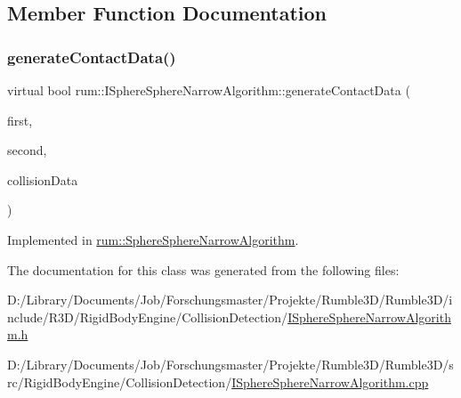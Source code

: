 \subsection{Member Function Documentation}
\mbox{\label{classrum_1_1_i_sphere_sphere_narrow_algorithm_a254273c64cab0473820639283f1e5e6f}} 
\subsubsection{\texorpdfstring{generate\+Contact\+Data()}{generateContactData()}}
{\footnotesize\ttfamily virtual bool rum\+::\+I\+Sphere\+Sphere\+Narrow\+Algorithm\+::generate\+Contact\+Data (\begin{DoxyParamCaption}\item[{\mbox{\hyperlink{classrum_1_1_collision_sphere}{Collision\+Sphere}} $\ast$}]{first,  }\item[{\mbox{\hyperlink{classrum_1_1_collision_sphere}{Collision\+Sphere}} $\ast$}]{second,  }\item[{\mbox{\hyperlink{classrum_1_1_collision_data}{Collision\+Data}} \&}]{collision\+Data }\end{DoxyParamCaption})\hspace{0.3cm}{\ttfamily [pure virtual]}}



Implemented in \mbox{\hyperlink{classrum_1_1_sphere_sphere_narrow_algorithm_a218ae392c2dde145a4c1fdd3c687f912}{rum\+::\+Sphere\+Sphere\+Narrow\+Algorithm}}.



The documentation for this class was generated from the following files\+:\begin{DoxyCompactItemize}
\item 
D\+:/\+Library/\+Documents/\+Job/\+Forschungsmaster/\+Projekte/\+Rumble3\+D/\+Rumble3\+D/include/\+R3\+D/\+Rigid\+Body\+Engine/\+Collision\+Detection/\mbox{\hyperlink{_i_sphere_sphere_narrow_algorithm_8h}{I\+Sphere\+Sphere\+Narrow\+Algorithm.\+h}}\item 
D\+:/\+Library/\+Documents/\+Job/\+Forschungsmaster/\+Projekte/\+Rumble3\+D/\+Rumble3\+D/src/\+Rigid\+Body\+Engine/\+Collision\+Detection/\mbox{\hyperlink{_i_sphere_sphere_narrow_algorithm_8cpp}{I\+Sphere\+Sphere\+Narrow\+Algorithm.\+cpp}}\end{DoxyCompactItemize}
